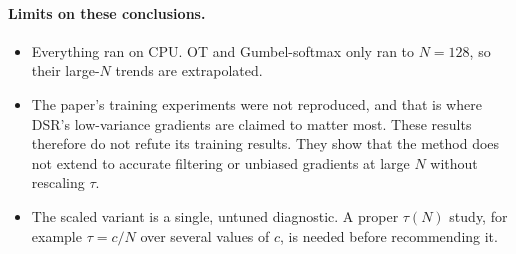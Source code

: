\paragraph{Limits on these conclusions.}
\begin{itemize}
\item Everything ran on CPU. OT and Gumbel-softmax only ran to $N{=}128$, so their large-$N$ trends are extrapolated.
\item The paper's training experiments were not reproduced, and that is where DSR's low-variance gradients are claimed to matter most. These results therefore do not refute its training results. They show that the method does not extend to accurate filtering or unbiased gradients at large $N$ without rescaling $\tau$.
\item The scaled variant is a single, untuned diagnostic. A proper $\tau(N)$ study, for example $\tau{=}c/N$ over several values of $c$, is needed before recommending it.
\end{itemize}
